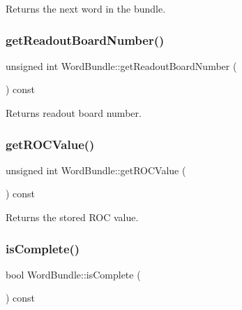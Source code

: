 Returns the next word in the bundle. 

\mbox{\label{class_word_bundle_a6d781e8e2bf5b1c0b67346bd6fd44ff9}} 
\subsubsection{\texorpdfstring{get\+Readout\+Board\+Number()}{getReadoutBoardNumber()}}
{\footnotesize\ttfamily unsigned int Word\+Bundle\+::get\+Readout\+Board\+Number (\begin{DoxyParamCaption}{ }\end{DoxyParamCaption}) const\hspace{0.3cm}{\ttfamily [inline]}}



Returns readout board number. 

\mbox{\label{class_word_bundle_ad2c91f230ac93d19900eba6b2c64d0e9}} 
\subsubsection{\texorpdfstring{get\+R\+O\+C\+Value()}{getROCValue()}}
{\footnotesize\ttfamily unsigned int Word\+Bundle\+::get\+R\+O\+C\+Value (\begin{DoxyParamCaption}{ }\end{DoxyParamCaption}) const\hspace{0.3cm}{\ttfamily [inline]}}



Returns the stored R\+OC value. 

\mbox{\label{class_word_bundle_a0a817b8d4266b5c2418743bf46ef5dee}} 
\subsubsection{\texorpdfstring{is\+Complete()}{isComplete()}}
{\footnotesize\ttfamily bool Word\+Bundle\+::is\+Complete (\begin{DoxyParamCaption}{ }\end{DoxyParamCaption}) const\hspace{0.3cm}{\ttfamily [inline]}}



